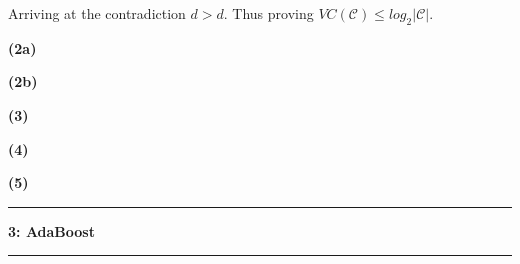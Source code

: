 \documentclass[11pt]{article}
\newcommand\question[2]{\vspace{.25in}\hrule\textbf{#1: #2}\vspace{.5em}\hrule\vspace{.10in}}
\renewcommand\part[1]{\vspace{.10in}\textbf{(#1)}}
\begin{document}
Arriving at the contradiction $d > d$. Thus proving $VC(\mathcal{C}) \leq log_2|\mathcal{C}|$.

\part{2a}

\part{2b}

\part{3}

\part{4}

\part{5}

\question{3}{AdaBoost}
\end{document}
